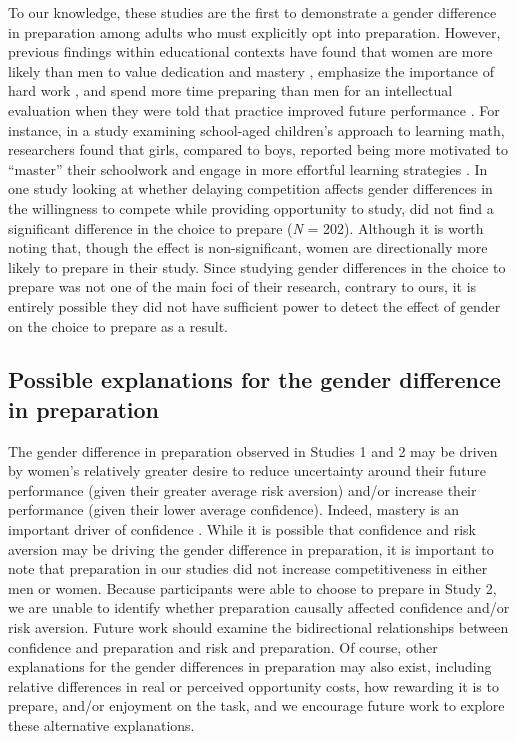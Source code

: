 \documentclass[a4paper,nobind]{templates/ociamthesis}
\begin{document}
To our knowledge, these studies are the first to demonstrate a gender difference in preparation among adults who must explicitly opt into preparation. However, previous findings within educational contexts have found that women are more likely than men to value dedication and mastery \autocite{Leslie2015,Kenney-Benson2006}, emphasize the importance of hard work \autocite{Mccrea2008,Hirt2009,Mccrea2008a}, and spend more time preparing than men for an intellectual evaluation when they were told that practice improved future performance \autocite{Kimble2005}. For instance, in a study examining school-aged children's approach to learning math, researchers found that girls, compared to boys, reported being more motivated to ``master'' their schoolwork and engage in more effortful learning strategies \autocite{Kenney-Benson2006}. In one study looking at whether delaying competition affects gender differences in the willingness to compete while providing opportunity to study, \textcite{Charness2021} did not find a significant difference in the choice to prepare (\emph{N} = 202). Although it is worth noting that, though the effect is non-significant, women are directionally more likely to prepare in their study. Since studying gender differences in the choice to prepare was not one of the main foci of their research, contrary to ours, it is entirely possible they did not have sufficient power to detect the effect of gender on the choice to prepare as a result.

\hypertarget{possible-explanations-for-the-gender-difference-in-preparation}{%
\subsection{Possible explanations for the gender difference in preparation}\label{possible-explanations-for-the-gender-difference-in-preparation}}

The gender difference in preparation observed in Studies 1 and 2 may be driven by women's relatively greater desire to reduce uncertainty around their future performance (given their greater average risk aversion) and/or increase their performance (given their lower average confidence). Indeed, mastery is an important driver of confidence \autocites[for review, see][]{Gist1992,Usher2008}. While it is possible that confidence and risk aversion may be driving the gender difference in preparation, it is important to note that preparation in our studies did not increase competitiveness in either men or women. Because participants were able to choose to prepare in Study 2, we are unable to identify whether preparation causally affected confidence and/or risk aversion. Future work should examine the bidirectional relationships between confidence and preparation and risk and preparation. Of course, other explanations for the gender differences in preparation may also exist, including relative differences in real or perceived opportunity costs, how rewarding it is to prepare, and/or enjoyment on the task, and we encourage future work to explore these alternative explanations.
\end{document}
